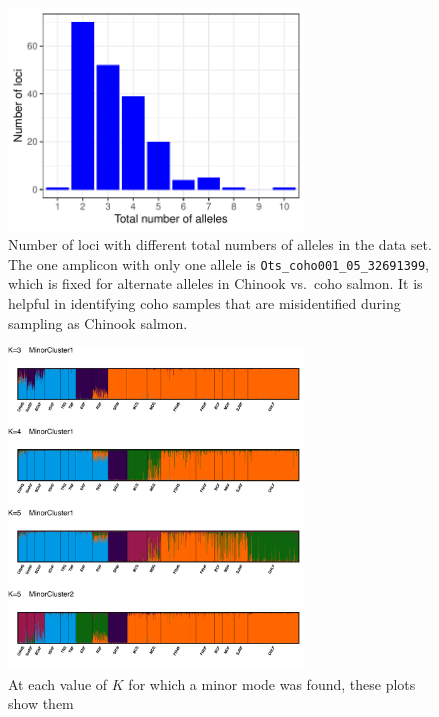 \begin{figure}
\begin{center}
\includegraphics[width=0.7\textwidth]{images/num-alle-barplot.pdf}
\end{center}
\caption[Number of loci with different
total numbers of alleles]{\footnotesize Number of loci with different
total numbers of alleles in the data set. The one amplicon with only
one allele is {\tt Ots\_coho001\_05\_32691399}, which is fixed for alternate alleles
in Chinook vs.\ coho salmon. It is helpful in identifying coho samples that are
misidentified during sampling as Chinook salmon.}
\label{fig:num-alle}
\end{figure}




\begin{figure}
\begin{center}
\includegraphics[width=0.7\textwidth]{images/minor-modes-crop.pdf}
\end{center}
\caption[STRUCTURE minor modes found by CLUMPAK]{\footnotesize At each value of $K$
for which a minor mode was found, these plots show them}
\label{fig:minor-modes}
\end{figure}


